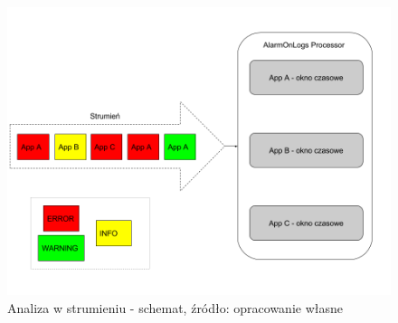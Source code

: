     \begin{figure}[H]
        \centering
        \includegraphics[width=1.0\textwidth]{images/aol_stream}
        \caption[Analiza w strumieniu - schemat]{
            Analiza w strumieniu - schemat, 
            źródło: opracowanie własne
        }
        \label{chapter:application:plans:alarm_on_logs:streaming:diagram}
    \end{figure}
    
